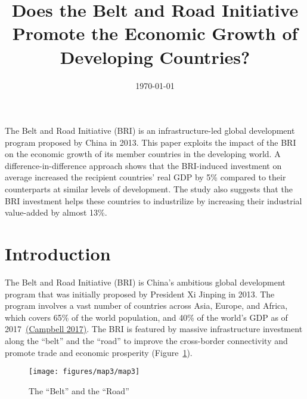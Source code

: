 \documentclass[10pt,a4paper]{article}
\renewenvironment{abstract}
  {{\bfseries\noindent{\abstractname}\par\nobreak}\footnotesize}
  {\bigskip}
\begin{document}
\title{Does the Belt and Road Initiative Promote the Economic Growth of
Developing Countries?}



\vspace{-1em}



  \date{\today}


\begingroup
\let\center\flushleft
\let\endcenter\endflushleft
\maketitle
\endgroup


\linenumbers



\onehalfspacing


\begin{abstract}
The Belt and Road Initiative (BRI) is an infrastructure-led global
development program proposed by China in 2013. This paper exploits the
impact of the BRI on the economic growth of its member countries in the
developing world. A difference-in-difference approach shows that the
BRI-induced investment on average increased the recipient countries'
real GDP by 5\% compared to their counterparts at similar levels of
development. The study also suggests that the BRI investment helps these
countries to industrilize by increasing their industrial value-added by
almost 13\%.~%
\end{abstract}%




\section{Introduction}

{\label{921879}}

The Belt and Road Initiative (BRI) is China's ambitious global
development program that was initially proposed by President Xi Jinping
in 2013. The program involves a vast number of countries across Asia,
Europe, and Africa, which covers 65\% of the world population, and 40\%
of the world's GDP as of 2017~\hyperref[csl:1]{(Campbell 2017)}. The BRI is featured by
massive infrastructure investment along the ``belt'' and the ``road'' to
improve the cross-border connectivity and promote trade and economic
prosperity (Figure~{\ref{885875}}).~

\par\null{}
\begin{figure}[H]
\begin{center}
\texttt{[image: figures/map3/map3]}
\caption{{The ``Belt'' and the ``Road''
{\label{885875}}%
}}
\end{center}
\end{figure}
\end{document}
